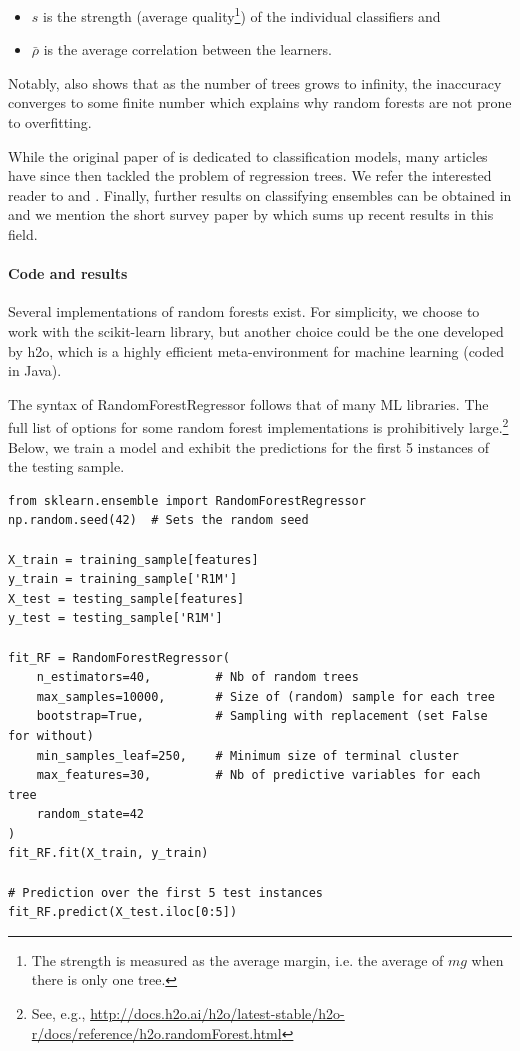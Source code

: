 \begin{itemize}
\item $s$ is the strength (average quality\footnote{The strength is measured as the average margin, i.e. the average of $mg$ when there is only one tree.}) of the individual classifiers and
\item $\bar{\rho}$ is the average correlation between the learners.
\end{itemize}

Notably, \cite{breiman2001random} also shows that as the number of trees grows to infinity, the inaccuracy converges to some finite number which explains why random forests are not prone to overfitting.

While the original paper of \cite{breiman2001random} is dedicated to classification models, many articles have since then tackled the problem of regression trees. We refer the interested reader to \cite{biau2012analysis} and \cite{scornet2015consistency}. Finally, further results on classifying ensembles can be obtained in \cite{biau2008consistency} and we mention the short survey paper by \cite{denil2014narrowing} which sums up recent results in this field.

\paragraph{Code and results}

Several implementations of random forests exist. For simplicity, we choose to work with the scikit-learn library, but another choice could be the one developed by h2o, which is a highly efficient meta-environment for machine learning (coded in Java).

The syntax of RandomForestRegressor follows that of many ML libraries. The full list of options for some random forest implementations is prohibitively large.\footnote{See, e.g., \href{http://docs.h2o.ai/h2o/latest-stable/h2o-r/docs/reference/h2o.randomForest.html}{http://docs.h2o.ai/h2o/latest-stable/h2o-r/docs/reference/h2o.randomForest.html}} Below, we train a model and exhibit the predictions for the first 5 instances of the testing sample.

\begin{verbatim}
from sklearn.ensemble import RandomForestRegressor
np.random.seed(42)  # Sets the random seed

X_train = training_sample[features]
y_train = training_sample['R1M']
X_test = testing_sample[features]
y_test = testing_sample['R1M']

fit_RF = RandomForestRegressor(
    n_estimators=40,         # Nb of random trees
    max_samples=10000,       # Size of (random) sample for each tree
    bootstrap=True,          # Sampling with replacement (set False for without)
    min_samples_leaf=250,    # Minimum size of terminal cluster
    max_features=30,         # Nb of predictive variables for each tree
    random_state=42
)
fit_RF.fit(X_train, y_train)

# Prediction over the first 5 test instances
fit_RF.predict(X_test.iloc[0:5])
\end{verbatim}

